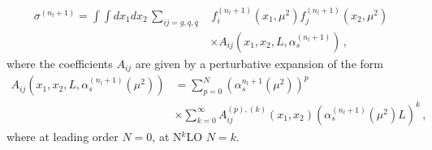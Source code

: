 \begin{align}
    \label{eq:massless_1}
    \sigma^{(n_l+1)} = \int \int dx_1 dx_2\, \sum_{ij=g,q,\bar{q}}&\, 
    f_i^{(n_l+1)}\left(x_1,\mu^2\right)f_j^{(n_l+1)}\left(x_2,\mu^2\right) \nonumber \\
    &\times A_{ij}\left(x_1,x_2,L,\alpha_s^{(n_l+1)}\right)\,,
\end{align}
where the coefficients $A_{ij}$ are given by a perturbative expansion of the form
\begin{align}
    \label{eq:expansionA}
    A_{ij}\left(x_1,x_2,L,\alpha_s^{(n_l+1)}\left(\mu^2\right)\right)&
    = \sum_{p=0}^N \left(\alpha_s^{n_l+1}\left(\mu^2\right)\right)^p \nonumber\\
    &\times\sum_{k=0}^{\infty} A_{ij}^{(p),(k)}\left(x_1,x_2\right)\left(\alpha_s^{(n_l+1)}\left(\mu^2\right)L\right)^k\,,
\end{align}
where at leading order $N=0$, at N$^k$LO $N=k$.

